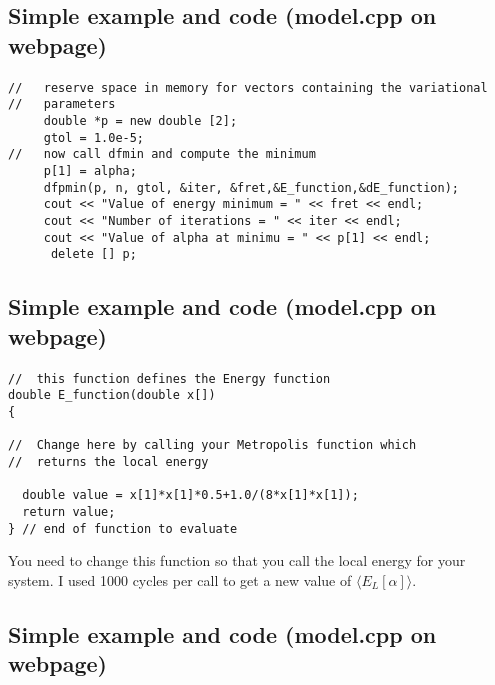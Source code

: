 \documentclass[%
twoside,                 %
final,                   %
10pt]{article}
\begin{document}
\subsection*{Simple example and code (model.cpp on webpage)}

\paragraph{}
\begin{verbatim}
//   reserve space in memory for vectors containing the variational
//   parameters
     double *p = new double [2];
     gtol = 1.0e-5;
//   now call dfmin and compute the minimum
     p[1] = alpha;
     dfpmin(p, n, gtol, &iter, &fret,&E_function,&dE_function);
     cout << "Value of energy minimum = " << fret << endl;
     cout << "Number of iterations = " << iter << endl;
     cout << "Value of alpha at minimu = " << p[1] << endl;
      delete [] p;
\end{verbatim}



\subsection*{Simple example and code (model.cpp on webpage)}

\paragraph{}
\begin{verbatim}
//  this function defines the Energy function
double E_function(double x[])
{

//  Change here by calling your Metropolis function which 
//  returns the local energy

  double value = x[1]*x[1]*0.5+1.0/(8*x[1]*x[1]);
  return value;
} // end of function to evaluate
\end{verbatim}
You need to change this function so that you call the local energy for your system. I used 1000
cycles per call to get a new value of $\langle E_L[\alpha]\rangle$.



\subsection*{Simple example and code (model.cpp on webpage)}
\end{document}
